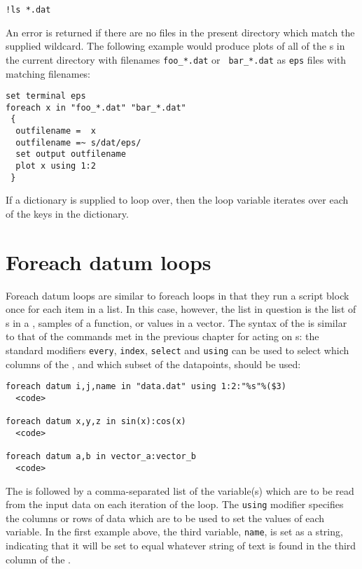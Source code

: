 \begin{verbatim}
!ls *.dat
\end{verbatim}

An error is returned if there are no files in the present directory which match
the supplied wildcard. The following example would produce plots of all of the
\datafile s in the current directory with filenames {\tt foo\_*.dat} or {\tt
bar\_*.dat} as {\tt eps} files with matching filenames:

\begin{verbatim}
set terminal eps
foreach x in "foo_*.dat" "bar_*.dat"
 {
  outfilename =  x
  outfilename =~ s/dat/eps/
  set output outfilename
  plot x using 1:2
 }
\end{verbatim}

If a dictionary is supplied to loop over, then the loop variable iterates over
each of the keys in the dictionary.

\section{Foreach datum loops}
\label{sec:foreach_datum}

Foreach datum loops are similar to foreach loops in that they run a script
block once for each item in a list.  In this case, however, the list in
question is the list of \datapoint s in a \datafile, samples of a function, or
values in a vector. The syntax of the  is similar to
that of the commands met in the previous chapter for acting on \datafile s:
the standard modifiers {\tt every}, {\tt index}, {\tt select} and {\tt using}
can be used to select which columns of the \datafile, and which subset of the
datapoints, should be used:

\begin{verbatim}
foreach datum i,j,name in "data.dat" using 1:2:"%s"%($3)
  <code>

foreach datum x,y,z in sin(x):cos(x)
  <code>

foreach datum a,b in vector_a:vector_b
  <code>
\end{verbatim}

The  is followed by a comma-separated list of the
variable(s) which are to be read from the input data on each iteration of the
loop. The {\tt using} modifier specifies the columns or rows of data which are
to be used to set the values of each variable. In the first example above, the
third variable, {\tt name}, is set as a string, indicating that it will be set
to equal whatever string of text is found in the third column of the \datafile.

